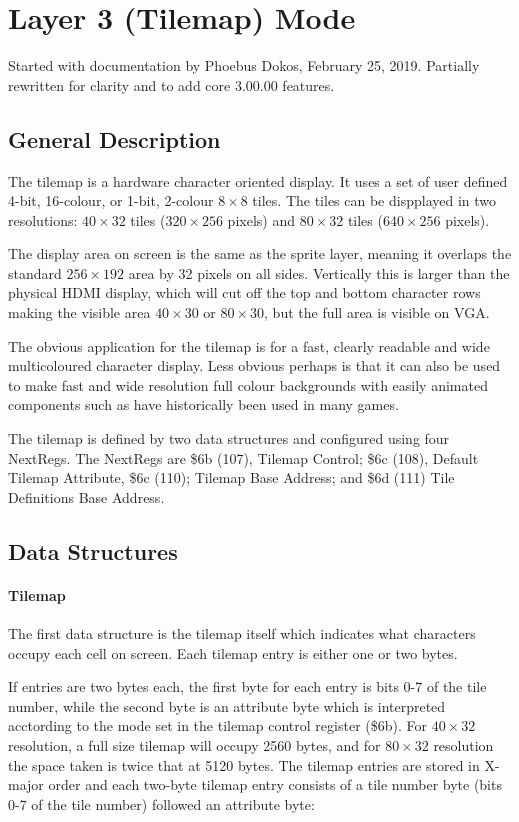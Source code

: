 \section{Layer 3 (Tilemap) Mode}

Started with documentation by Phoebus Dokos, February 25,
2019. Partially rewritten for clarity and to add core 3.00.00
features.

\subsection{General Description}
The tilemap is a hardware character oriented display. It uses a set of
user defined 4-bit, 16-colour, or 1-bit, 2-colour $8\times8$
tiles. The tiles can be dispplayed in two resolutions: $40\times32$
tiles ($320\times256$ pixels) and $80\times32$ tiles ($640\times256$
pixels).

The display area on screen is the same as the sprite layer, meaning it
overlaps the standard $256\times192$ area by 32 pixels on all
sides. Vertically this is larger than the physical HDMI display, which
will cut off the top and bottom character rows making the visible area
$40\times30$ or $80\times30$, but the full area is visible on VGA.

The obvious application for the tilemap is for a fast, clearly
readable and wide multicoloured character display. Less obvious
perhaps is that it can also be used to make fast and wide resolution
full colour backgrounds with easily animated components such as have
historically been used in many games.

The tilemap is defined by two data structures and configured using
four NextRegs. The NextRegs are \$6b (107), Tilemap Control; \$6c
(108), Default Tilemap Attribute, \$6c (110); Tilemap Base Address;
and \$6d (111) Tile Definitions Base Address.

\subsection{Data Structures}

\paragraph{Tilemap}

The first data structure is the tilemap itself which indicates what
characters occupy each cell on screen. Each tilemap entry is either
one or two bytes.

If entries are two bytes each, the first byte for each entry is bits
0-7 of the tile number, while the second byte is an attribute byte
which is interpreted acctording to the mode set in the tilemap control
register (\$6b). For $40\times32$ resolution, a full size tilemap will
occupy 2560 bytes, and for $80\times32$ resolution the space taken is
twice that at 5120 bytes. The tilemap entries are stored in X-major
order and each two-byte tilemap entry consists of a tile number byte
(bits 0-7 of the tile number) followed an attribute byte:

